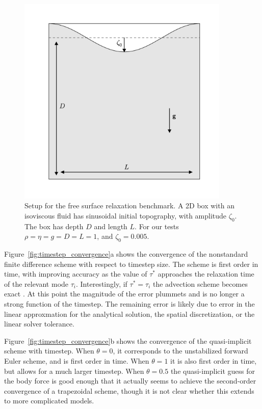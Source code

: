 \documentclass[preprint,12pt,authoryear]{elsarticle}
\begin{document}
\begin{figure}
\includegraphics[width=0.9\textwidth]{figures/benchmark_setup.pdf}
\caption{Setup for the free surface relaxation benchmark. A 2D box with an isoviscous fluid has sinusoidal initial topography, with amplitude $\zeta_0$. The box has depth $D$ and length $L$. For our tests $\rho = \eta = g = D = L = 1$, and $\zeta_0 = 0.005$.}
\label{fig:benchmark_setup}
\end{figure}

Figure~\ref{fig:timestep_convergence}a shows the convergence of the nonstandard finite difference scheme 
with respect to timestep size. The scheme is first order in time, with improving accuracy as the value of $\tau^*$ approaches
the relaxation time of the relevant mode $\tau_i$. Interestingly, if $\tau^* = \tau_i$ the advection scheme
becomes exact \citep{mickens2002nonstandard}. At this point the magnitude of the error plummets and is no longer 
a strong function of the timestep. The remaining error is likely due to error in the linear approxmation for 
the analytical solution, the spatial discretization, or the linear solver tolerance. 

Figure~\ref{fig:timestep_convergence}b shows the convergence of the quasi-implicit scheme with timestep.
When $\theta=0$, it corresponds to the unstabilized forward Euler scheme, and is first order in time. 
When $\theta=1$ it is also first order in time, but allows for a much larger timestep.  When $\theta=0.5$
the quasi-implicit guess for the body force is good enough that it actually seems to achieve the second-order 
convergence of a trapezoidal scheme, though it is not clear whether this extends to more complicated models.
\end{document}
